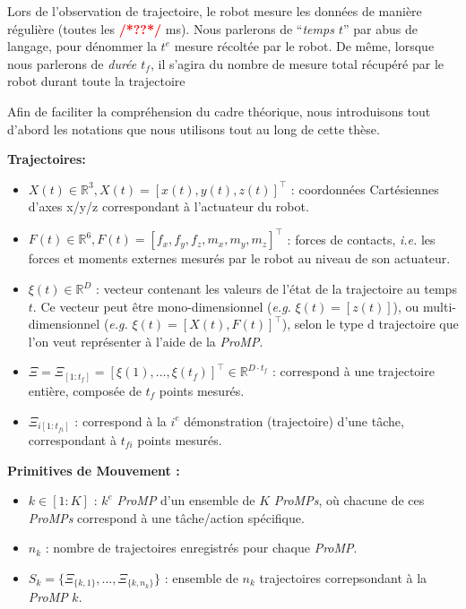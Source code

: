 \documentclass[utf8]{frontiersSCNS} %
\newcommand{\todo}[1]{\textcolor{red}{\textbf{/*#1*/}}}
\begin{document}
Lors de l'observation de trajectoire, le robot mesure les données de manière régulière (toutes les \todo{??} ms). Nous parlerons de ``\textit{temps $t$}'' par abus de langage, pour dénommer la $t^e$ mesure récoltée par le robot. De même, lorsque nous parlerons de \textit{durée $t_f$}, il s'agira du nombre de mesure total récupéré par le robot durant toute la trajectoire

Afin de faciliter la compréhension du cadre théorique, nous introduisons tout d'abord les notations que nous utilisons tout au long de cette thèse.

\noindent
\textbf{Trajectoires:}
\begin{itemize}
\item $X(t)\in \mathbb{R}^3, X(t) = [x(t), y(t), z(t)]^\top$ : coordonnées Cartésiennes d'axes x/y/z correspondant à l'actuateur du robot.
\item $F(t) \in \mathbb{R}^6, F(t) = [f_x, f_y, f_z, m_x, m_y, m_z]^\top$ : forces de contacts, \textit{i.e.} les forces et moments externes mesurés par le robot au niveau de son actuateur.
\item $\xi(t) \in \mathbb{R}^D$ : vecteur contenant les valeurs de l'état de la trajectoire au temps $t$. Ce vecteur peut être mono-dimensionnel (\textit{e.g.} $\xi(t) = [z(t)]$), ou multi-dimensionnel (\textit{e.g.} $\xi(t) = [X(t), F(t)]^\top$), selon le type d trajectoire que l'on veut représenter à l'aide de la \textit{ProMP}.

\item $\Xi = \Xi_{[1:t_{f}]} = [\xi(1), \ldots, \xi(t_{f})]^\top \in \mathbb{R}^{D \cdot t_{f}}$ : correspond à une trajectoire entière, composée de $t_f$ points mesurés.

\item $\Xi_{i[1:t_{fi}]}$ : correspond à la $i^{e}$ démonstration (trajectoire) d'une tâche, correspondant à $t_{fi}$ points mesurés.


\end{itemize}
\textbf{Primitives de Mouvement :}
\begin{itemize}
\item $k \in [1:K]$ : $k^{e}$ \textit{ProMP} d'un ensemble de $K$ \textit{ProMPs}, où chacune de ces \textit{ProMPs} correspond à une tâche/action spécifique.
\item $n_k$ : nombre de trajectoires enregistrés pour chaque \textit{ProMP}.
\item $S_k = \{\Xi_{\{k,1\}},\ldots,\Xi_{\{k,n_k\}}\}$ : ensemble de $n_k$ trajectoires correpsondant à la \textit{ProMP} $k$. 
\end{itemize}
\end{document}
